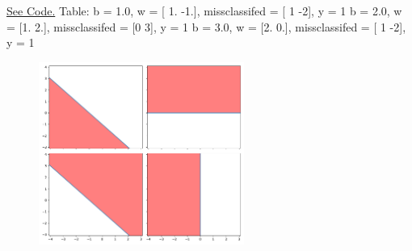 \begin{solution}
  \href{https://colab.research.google.com/drive/1XSP7PzGKmMe4VG36j68XdeXWF5bw9xWi?usp=sharing}{See Code.} \newline
  Table: \newline
  b = 1.0, w = [ 1. -1.], missclassifed = [ 1 -2], y = 1 \newline
  b = 2.0, w = [1. 2.], missclassifed = [0 3], y = 1 \newline
  b = 3.0, w = [2. 0.], missclassifed = [ 1 -2], y = 1
  \begin{figure}[H]
    \centering
    \includegraphics[width=0.6\textwidth]{images/fig4.pdf}
  \end{figure}
\end{solution}

